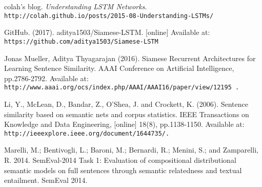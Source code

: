 \begin{thebibliography}{9}

colah's blog.
\textit{Understanding LSTM Networks}.
\\\texttt{http://colah.github.io/posts/2015-08-Understanding-LSTMs/}

GitHub. (2017). aditya1503/Siamese-LSTM. [online] Available at: \\\texttt{https://github.com/aditya1503/Siamese-LSTM }

Jonas Mueller, Aditya Thyagarajan (2016). Siamese Recurrent Architectures for Learning Sentence Similarity. AAAI Conference on Artificial Intelligence, pp.2786-2792. Available at: \\\texttt{http://www.aaai.org/ocs/index.php/AAAI/AAAI16/paper/view/12195 .}

Li, Y., McLean, D., Bandar, Z., O'Shea, J. and Crockett, K. (2006). Sentence similarity based on semantic nets and corpus statistics. IEEE Transactions on Knowledge and Data Engineering, [online] 18(8), pp.1138-1150. Available at: \\\texttt{http://ieeexplore.ieee.org/document/1644735/.}

Marelli, M.; Bentivogli, L.; Baroni, M.; Bernardi, R.; Menini, S.; and Zamparelli, R. 2014. SemEval-2014 Task 1: Evaluation of compositional distributional semantic models on full sentences through semantic relatedness and textual entailment. SemEval 2014.



\end{thebibliography}